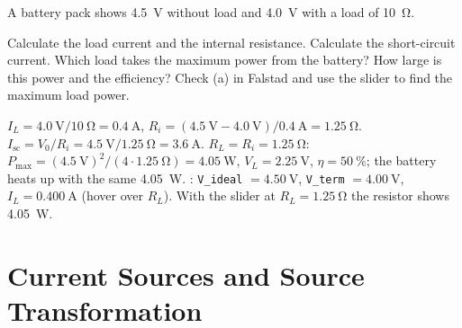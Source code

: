 A battery pack shows \SI{4.5}{\volt} without load and \SI{4.0}{\volt} with a load of \SI{10}{\ohm}.
\begin{talist}
\ta Calculate the load current and the internal resistance.
\ta Calculate the short-circuit current.
\ta Which load takes the maximum power from the battery? How large is this power and the efficiency?
\ta Check (a) in Falstad and use the slider to find the maximum load power.
\end{talist}

\begin{solution}
\begin{talist}
\ta $I_L = \SI{4.0}{\volt}/\SI{10}{\ohm} = \SI{0.4}{\ampere}$, $R_i = (\SI{4.5}{\volt}-\SI{4.0}{\volt})/\SI{0.4}{\ampere} = \SI{1.25}{\ohm}$.
\ta $I_\mathrm{sc} = V_0/R_i = \SI{4.5}{\volt}/\SI{1.25}{\ohm} = \SI{3.6}{\ampere}$.
\ta $R_L = R_i = \SI{1.25}{\ohm}$: $P_\mathrm{max} = (\SI{4.5}{\volt})^2/(4\cdot\SI{1.25}{\ohm}) = \SI{4.05}{\watt}$,
    $V_L = \SI{2.25}{\volt}$, $\eta = \SI{50}{\percent}$; the battery heats up with the same \SI{4.05}{\watt}.
\ta {}: \texttt{V\_ideal} $=\SI{4.50}{\volt}$, \texttt{V\_term} $=\SI{4.00}{\volt}$, $I_L = \SI{0.400}{\ampere}$
    (hover over $R_L$). With the slider at $R_L = \SI{1.25}{\ohm}$ the resistor shows \SI{4.05}{\watt}.
\end{talist}
\end{solution}

\section{Current Sources and Source Transformation}

